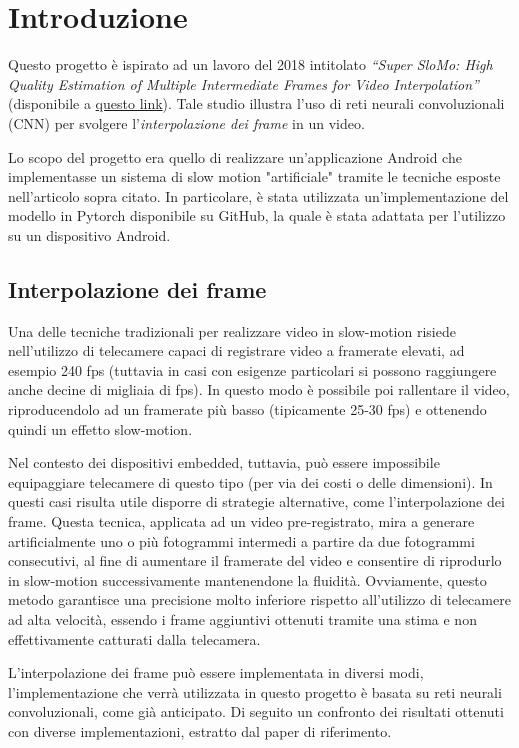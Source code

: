 \chapter*{Introduzione}

Questo progetto è ispirato ad un lavoro del 2018 intitolato 
\textit{``Super SloMo: High Quality Estimation of Multiple Intermediate Frames for Video Interpolation''}
(disponibile a \href{http://jianghz.me/projects/superslomo/}{questo link}).
Tale studio illustra l'uso di reti neurali convoluzionali (CNN) per svolgere l'\textit{interpolazione dei frame} 
in un video.

Lo scopo del progetto era quello di realizzare un'applicazione Android che implementasse un sistema di slow motion 
"artificiale" tramite le tecniche esposte nell'articolo sopra citato. In particolare, è stata utilizzata 
un'implementazione del modello in Pytorch disponibile su GitHub, la quale è stata adattata per l'utilizzo su un 
dispositivo Android.

\section*{Interpolazione dei frame}

Una delle tecniche tradizionali per realizzare video in slow-motion risiede nell'utilizzo di telecamere capaci di 
registrare video a framerate elevati, ad esempio 240 fps (tuttavia in casi con esigenze particolari si possono 
raggiungere anche decine di migliaia di fps). In questo modo è possibile poi rallentare il video, riproducendolo ad 
un framerate più basso (tipicamente 25-30 fps) e ottenendo quindi un effetto slow-motion.

Nel contesto dei dispositivi embedded, tuttavia, può essere impossibile equipaggiare telecamere di questo tipo (per via
dei costi o delle dimensioni). In questi casi risulta utile disporre di strategie alternative, come l'interpolazione dei 
frame. Questa tecnica, applicata ad un video pre-registrato, mira a generare artificialmente uno o più fotogrammi intermedi 
a partire da due fotogrammi consecutivi, al fine di aumentare il framerate del video e consentire di riprodurlo in slow-motion
successivamente mantenendone la fluidità. Ovviamente, questo metodo garantisce una precisione molto inferiore rispetto
all'utilizzo di telecamere ad alta velocità, essendo i frame aggiuntivi ottenuti tramite una stima e non effettivamente
catturati dalla telecamera.

L'interpolazione dei frame può essere implementata in diversi modi, l'implementazione che verrà utilizzata in questo progetto
è basata su reti neurali convoluzionali, come già anticipato. Di seguito un confronto dei risultati ottenuti con diverse
implementazioni, estratto dal paper di riferimento.

